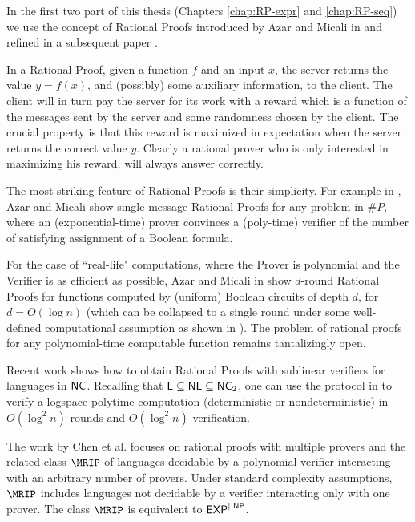 In the first two part of this thesis (Chapters \ref{chap:RP-expr} and \ref{chap:RP-seq}) we use the concept of {\sf Rational Proofs} introduced by Azar and Micali in \cite{am} and refined in a subsequent paper \cite{am1}. 

In a Rational Proof, given a function $f$ and an input $x$, the server returns the value $y=f(x)$, and (possibly) some auxiliary information, to the client. The client will in turn 
pay the server for its work with a reward which is a function of the messages 
sent by the server and some randomness chosen by the client.  The crucial 
property is that this reward is maximized in expectation when the server 
returns the correct value $y$. Clearly a rational prover who is only interested 
in maximizing his reward, will always answer correctly. 

The most striking feature of Rational Proofs is their simplicity. For example in \cite{am}, Azar and Micali show {\sf single-message} Rational Proofs for any problem in $\#P$, where an (exponential-time) prover convinces a (poly-time) verifier of the number of satisfying assignment of a Boolean formula. 

For the case of ``real-life" computations, where the Prover is polynomial and the Verifier is as efficient as possible, Azar and Micali in \cite{am1} show $d$-round Rational Proofs for functions computed by (uniform) Boolean circuits of depth $d$, for $d=O(\log n)$ (which can be collapsed to a single round under some well-defined computational assumption as shown in \cite{ratargs}). The problem of rational proofs for any polynomial-time computable function remains tantalizingly open. 


Recent work \cite{ratsumchecks} shows how to obtain Rational Proofs with sublinear verifiers for languages in ${\mathsf{NC}}$. Recalling that ${\mathsf{L}} \subseteq {\ensuremath{\mathsf{NL}}} \subseteq {\ensuremath{\mathsf{NC}}}_2$, one can use the protocol  in \cite{ratsumchecks} to verify a logspace polytime computation (deterministic or nondeterministic) in $O(\log^2 n )$ rounds and $O(\log^2 n )$ verification.

The work by Chen et al. \cite{chen2016rational} focuses on rational proofs with multiple provers and the related class $\MRIP$ of languages decidable by a polynomial verifier interacting with an arbitrary number of provers. Under standard complexity assumptions, $\MRIP$ includes languages not decidable by a verifier interacting only with one prover. The class $\MRIP$ is equivalent to ${\mathsf{EXP}}^{||{\mathsf{NP}}}$.



